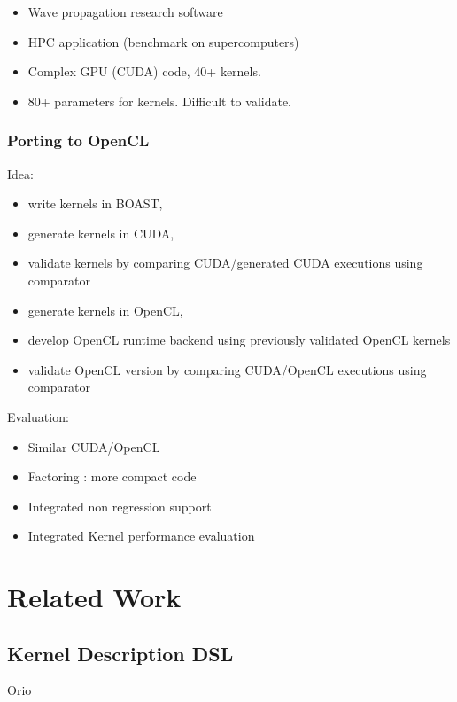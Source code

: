 \documentclass[review]{elsarticle}
\begin{document}
\begin{itemize}

\item Wave propagation research software

\item HPC application (benchmark on supercomputers)

\item Complex GPU (CUDA) code, 40+ kernels.

\item 80+ parameters for kernels. Difficult to validate.
\end{itemize}

    \subsubsection{Porting to OpenCL}

  Idea:
\begin{itemize}
\item write kernels in BOAST,
\item generate kernels in CUDA,
\item validate kernels by comparing CUDA/generated CUDA executions using comparator
\item generate kernels in OpenCL,
\item develop OpenCL runtime backend using previously validated OpenCL kernels
\item validate OpenCL version by comparing CUDA/OpenCL executions using comparator
\end{itemize}

  Evaluation:
\begin{itemize}
\item Similar CUDA/OpenCL
\item Factoring : more compact code
\item Integrated non regression support
\item Integrated Kernel performance evaluation
\end{itemize}

\section{Related Work}

  \subsection{Kernel Description DSL}

  Orio
\end{document}
